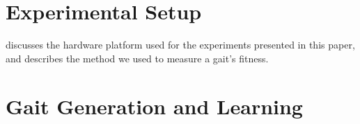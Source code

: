 


\section{Experimental Setup}

 discusses the hardware platform used for the
experiments presented in this paper, and 
describes the method we used to measure a gait's fitness.








\section{Gait Generation and Learning}




